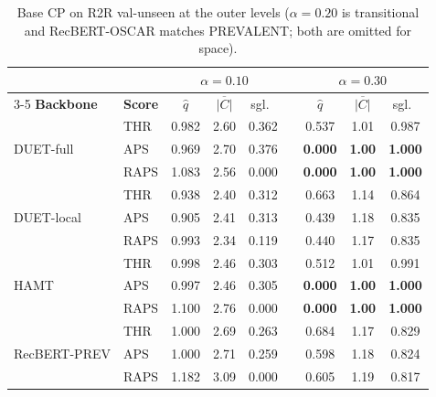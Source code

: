 \begin{table}[t]
\centering
\caption{Base CP on R2R val-unseen at the outer levels ($\alpha=0.20$ is
transitional and RecBERT-OSCAR matches PREVALENT; both are omitted for
space).}
\label{tab:basecp}
\setlength{\tabcolsep}{3.4pt}\scriptsize
\renewcommand{\arraystretch}{0.93}%
\begin{tabular}{ll ccc c ccc}
\toprule
& & \multicolumn{3}{c}{$\alpha = 0.10$} & &
    \multicolumn{3}{c}{$\alpha = 0.30$} \\
\cmidrule{3-5}\cmidrule{7-9}
\textbf{Backbone} & \textbf{Score}
 & $\hat{q}$ & $\overline{|C|}$ & sgl.\ &
 & $\hat{q}$ & $\overline{|C|}$ & sgl.\ \\
\midrule
\multirow{3}{*}{DUET-full}
 & THR  & 0.982 & 2.60 & 0.362 & & 0.537 & 1.01 & 0.987 \\
 & APS  & 0.969 & 2.70 & 0.376 & & \textbf{0.000} & \textbf{1.00} & \textbf{1.000} \\
 & RAPS & 1.083 & 2.56 & 0.000 & & \textbf{0.000} & \textbf{1.00} & \textbf{1.000} \\
\midrule
\multirow{3}{*}{DUET-local}
 & THR  & 0.938 & 2.40 & 0.312 & & 0.663 & 1.14 & 0.864 \\
 & APS  & 0.905 & 2.41 & 0.313 & & 0.439 & 1.18 & 0.835 \\
 & RAPS & 0.993 & 2.34 & 0.119 & & 0.440 & 1.17 & 0.835 \\
\midrule
\multirow{3}{*}{HAMT}
 & THR  & 0.998 & 2.46 & 0.303 & & 0.512 & 1.01 & 0.991 \\
 & APS  & 0.997 & 2.46 & 0.305 & & \textbf{0.000} & \textbf{1.00} & \textbf{1.000} \\
 & RAPS & 1.100 & 2.76 & 0.000 & & \textbf{0.000} & \textbf{1.00} & \textbf{1.000} \\
\midrule
\multirow{3}{*}{RecBERT-PREV}
 & THR  & 1.000 & 2.69 & 0.263 & & 0.684 & 1.17 & 0.829 \\
 & APS  & 1.000 & 2.71 & 0.259 & & 0.598 & 1.18 & 0.824 \\
 & RAPS & 1.182 & 3.09 & 0.000 & & 0.605 & 1.19 & 0.817 \\
\bottomrule
\end{tabular}
\end{table}
